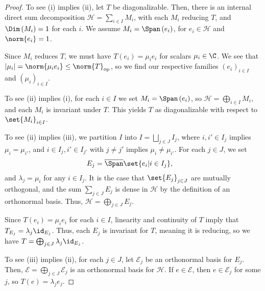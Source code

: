 \documentclass[10pt]{mypackage}
\begin{document}
\begin{proof}
  To see (i) implies (ii), let $T$ be diagonalizable. Then, there is an internal direct sum decomposition $\mathcal{H} = \sum_{i\in I}M_i$, with each $M_i$ reducing $T$, and $\Dim\left(M_i\right) = 1$ for each $i$. We assume $M_i = \Span\left(e_i\right)$, for $e_i\in \mathcal{H}$ and $\norm{e_i} = 1$.\newline

  Since $M_i$ reduces $T$, we must have $T\left(e_i\right) = \mu_ie_i$ for scalars $\mu_i\in \C$. We see that $\left\vert \mu_i \right\vert = \norm{\mu_ie_i} \leq \norm{T}_{\text{op}}$, so we find our respective families $\left(e_i\right)_{i\in I}$ and $\left(\mu_i\right)_{i\in I}$.\newline

  To see (ii) implies (i), for each $i\in I$ we set $M_i = \Span\left(e_i\right)$, so $\mathcal{H} = \bigoplus_{i\in I}M_i$, and each $M_i$ is invariant under $T$. This yields $T$ as diagonalizable with respect to $\set{M_i}_{i\in I}$.\newline

  To see (ii) implies (iii), we partition $I$ into $I = \bigsqcup_{j\in J}I_j$, where $i,i'\in I_j$ implies $\mu_i = \mu_{i'}$, and $i\in I_j,i'\in I_{j'}$ with $j\neq j'$ implies $\mu_{i} \neq \mu_{i'}$. For each $j\in J$, we set
  \begin{align*}
    E_j &= \overline{\Span}\set{e_i|i\in I_j},
  \end{align*}
  and $\lambda_j = \mu_i$ for any $i\in I_j$. It is the case that $\set{E_j}_{j\in J}$ are mutually orthogonal, and the sum $\sum_{j\in J}E_j$ is dense in $\mathcal{H}$ by the definition of an orthonormal basis. Thus, $\mathcal{H} = \bigoplus_{j\in J}E_j$.\newline

  Since $T\left(e_i\right) = \mu_ie_i$ for each $i\in I$, linearity and continuity of $T$ imply that $T_{E_j} = \lambda_j\id_{E_j}$. Thus, each $E_j$ is invariant for $T$, meaning it is reducing, so we have $T = \bigoplus_{j\in J}\lambda_j\id_{E_j}$.\newline

  To see (iii) implies (ii), for each $j\in J$, let $\mathcal{E}_{j}$ be an orthonormal basis for $E_j$. Then, $\mathcal{E} = \bigoplus_{j\in J}\mathcal{E}_j$ is an orthonormal basis for $\mathcal{H}$. If $e\in \mathcal{E}$, then $e\in \mathcal{E}_j$ for some $j$, so $T\left(e\right) = \lambda_je_j$.\newline


\end{proof}
\end{document}
